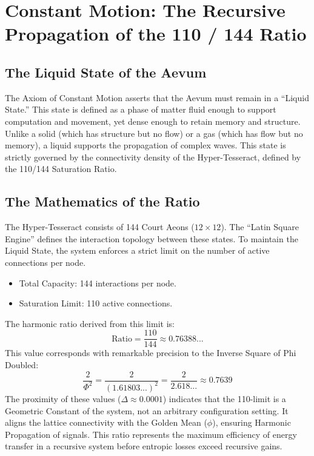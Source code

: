 \documentclass[12pt]{amsart}
\begin{document}
\section{Constant Motion: The Recursive Propagation of the 110 / 144 Ratio}\label{appendixI}

\subsection{The Liquid State of the Aevum}\label{appendixI.1}
The Axiom of Constant Motion asserts that the Aevum must remain in a ``Liquid State.'' This state is defined as a phase of matter fluid enough to support computation and movement, yet dense enough to retain memory and structure. Unlike a solid (which has structure but no flow) or a gas (which has flow but no memory), a liquid supports the propagation of complex waves. This state is strictly governed by the connectivity density of the Hyper-Tesseract, defined by the 110\slash 144 Saturation Ratio.

\subsection{The Mathematics of the Ratio}\label{appendixI.2}
The Hyper-Tesseract consists of 144 Court Aeons ($12 \times 12$). The ``Latin Square Engine'' defines the interaction topology between these states. To maintain the Liquid State, the system enforces a strict limit on the number of active connections per node.

\begin{itemize}
    \item Total Capacity: 144 interactions per node.
    \item Saturation Limit: 110 active connections.
\end{itemize}

The harmonic ratio derived from this limit is:
\[
\text{Ratio} = \frac{110}{144} \approx 0.76388...
\]
This value corresponds with remarkable precision to the Inverse Square of Phi Doubled:
\[
\frac{2}{\Phi^2} = \frac{2}{(1.61803...)^2} = \frac{2}{2.618...} \approx 0.7639
\]
The proximity of these values ($\Delta \approx 0.0001$) indicates that the 110-limit is a Geometric Constant of the system, not an arbitrary configuration setting. It aligns the lattice connectivity with the Golden Mean ($\phi$), ensuring Harmonic Propagation of signals. This ratio represents the maximum efficiency of energy transfer in a recursive system before entropic losses exceed recursive gains.
\end{document}
